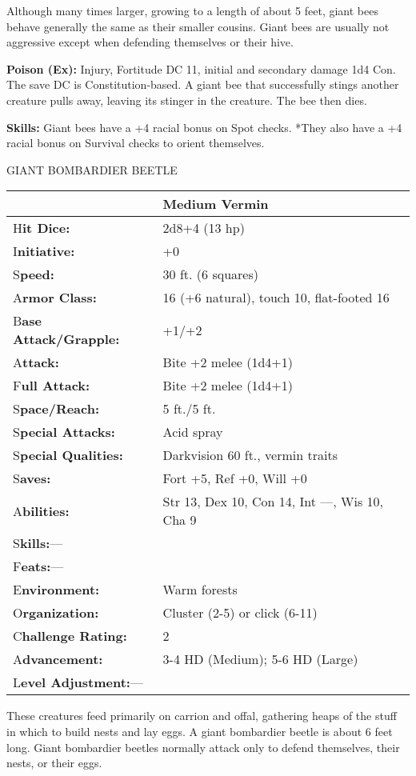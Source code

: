 \documentclass{article}
\begin{document}
Although many times larger, growing to a length of about 5 feet, giant bees behave 
generally the same as their smaller cousins. Giant bees are usually not aggressive 
except when defending themselves or their hive.

\textbf{Poison (Ex): }Injury, Fortitude DC 11, initial and secondary damage 1d4 
Con. The save DC is Constitution-based. A giant bee that successfully stings another 
creature pulls away, leaving its stinger in the creature. The bee then dies.

\textbf{Skills:} Giant bees have a +4 racial bonus on Spot checks. *They also have 
a +4 racial bonus on Survival checks to orient themselves.

\vspace{12pt}
GIANT BOMBARDIER BEETLE

\begin{tabular}{|>{\raggedright}p{91pt}|>{\raggedright}p{182pt}|}
\hline
  & Medium Vermin\tabularnewline
\hline
H\textbf{it Dice:} & 2d8+4 (13 hp)\tabularnewline
\hline
I\textbf{nitiative:} & +0\tabularnewline
\hline
S\textbf{peed:} & 30 ft. (6 squares)\tabularnewline
\hline
A\textbf{rmor Class:} & 16 (+6 natural), touch 10, flat-footed 16\tabularnewline
\hline
B\textbf{ase Attack/Grapple:} & +1/+2\tabularnewline
\hline
A\textbf{ttack:} & Bite +2 melee (1d4+1)\tabularnewline
\hline
F\textbf{ull Attack:} & Bite +2 melee (1d4+1)\tabularnewline
\hline
S\textbf{pace/Reach:} & 5 ft./5 ft.\tabularnewline
\hline
S\textbf{pecial Attacks:} & Acid spray\tabularnewline
\hline
S\textbf{pecial Qualities:} & Darkvision 60 ft., vermin traits\tabularnewline
\hline
S\textbf{aves:} & Fort +5, Ref +0, Will +0\tabularnewline
\hline
A\textbf{bilities:} & Str 13, Dex 10, Con 14, Int ---, Wis 10, Cha 9\tabularnewline
\hline
S\textbf{kills:}--- & \tabularnewline
\hline
F\textbf{eats:}--- & \tabularnewline
\hline
E\textbf{nvironment:} & Warm forests\tabularnewline
\hline
O\textbf{rganization:} & Cluster (2-5) or click (6-11)\tabularnewline
\hline
C\textbf{hallenge Rating:} & 2\tabularnewline
\hline
A\textbf{dvancement:} & 3-4 HD (Medium); 5-6 HD (Large)\tabularnewline
\hline
L\textbf{evel Adjustment:}--- & \tabularnewline
\hline
\end{tabular}

These creatures feed primarily on carrion and offal, gathering heaps of the stuff 
in which to build nests and lay eggs. A giant bombardier beetle is about 6 feet 
long. Giant bombardier beetles normally attack only to defend themselves, their 
nests, or their eggs.
\end{document}
